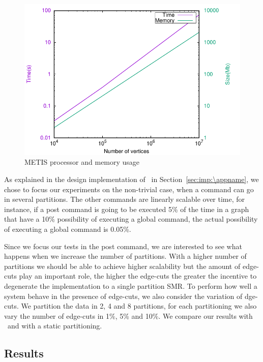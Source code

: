 \begin{figure}[t]
	\includegraphics[width=0.95\columnwidth]{figures/metis_size_time}
	\caption{METIS processor and memory usage}
	\label{fig:metis_size_time}
\end{figure}

As explained in the design implementation of \appname\ in Section~\ref{sec:imp:\appname}, we chose to focus our
experiments on the non-trivial case, when a command can go in several partitions. The other commands are linearly
scalable over time, for instance, if a post command is going to be executed 5\% of the time in a graph that have a 10\%
possibility of executing a global command, the actual possibility of executing a global command is 0.05\%.

Since we focus our tests in the post command, we are interested to see what happens when we increase the number of
partitions. With a higher number of partitions we should be able to achieve higher scalability but the amount of edge-cuts
play an important role, the higher the edge-cuts the greater the incentive to degenerate the implementation to a single
partition SMR. To perform how well a system behave in the presence of edge-cuts, we also consider the variation of
dge-cuts. We partition the data in 2, 4 and 8 partitions, for each partitioning we also vary the number of edge-cuts 
in 1\%, 5\% and 10\%. We compare our results with \dssmr\ and \ssmr with a static partitioning.



\subsection{Results}




\label{sec:evaluation:strongloc}

